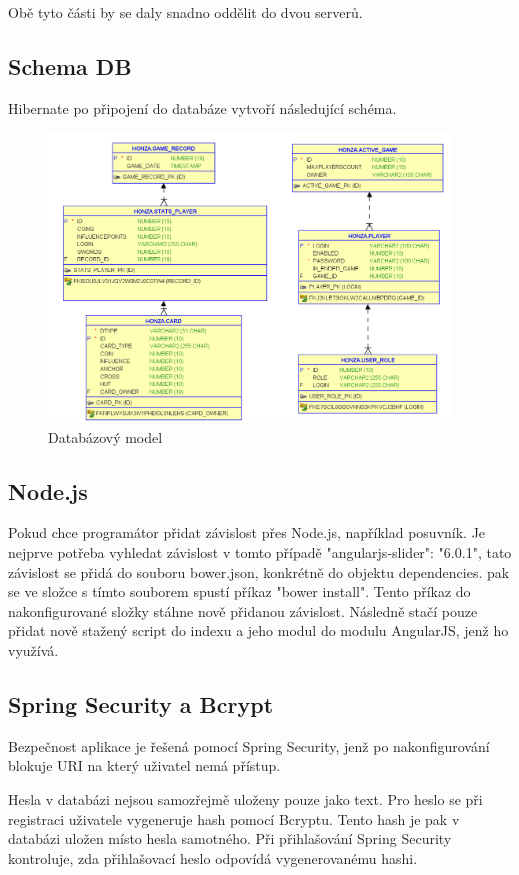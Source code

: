 \documentclass[czech,master,public,dept460,male,cpdeclaration,twoside]{diploma}
\begin{document}
Obě tyto části by se daly snadno oddělit do dvou serverů.

\subsection{Schema DB}
Hibernate po připojení do databáze vytvoří následující schéma.
\begin{figure}[H]
\centering\includegraphics[width=0.95\textwidth]{Figures/DBmodel.png}\caption{Databázový model}
\end{figure}

\subsection{Node.js}
Pokud chce programátor přidat závislost přes Node.js, například posuvník. Je nejprve potřeba vyhledat závislost v tomto případě "angularjs-slider": "6.0.1", tato závislost se přidá do souboru bower.json, konkrétně do objektu dependencies. pak se ve složce s tímto souborem spustí příkaz "bower install". Tento příkaz do nakonfigurované složky stáhne nově přidanou závislost. Následně stačí pouze přidat nově stažený script do indexu a jeho modul do modulu AngularJS, jenž ho využívá. 

\subsection{Spring Security a Bcrypt}
Bezpečnost aplikace je řešená pomocí Spring Security, jenž po nakonfigurování blokuje URI na který uživatel nemá přístup.

Hesla v databázi nejsou samozřejmě uloženy pouze jako text. Pro heslo se při registraci uživatele vygeneruje hash pomocí Bcryptu. Tento hash je pak v databázi uložen místo hesla samotného. Při přihlašování Spring Security kontroluje, zda přihlašovací heslo odpovídá vygenerovanému hashi.
\end{document}
